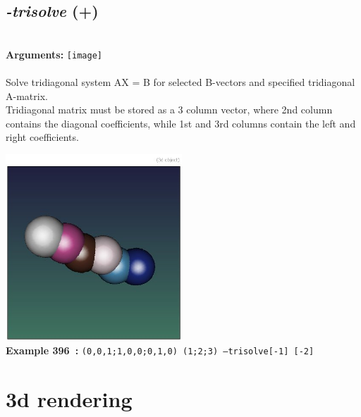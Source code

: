 \documentclass[a4paper,11pt,twoside]{book}
\begin{document}
\subsection{\emph{-trisolve} (+)}\vspace*{-0.5em}
~\\\textbf{Arguments: } 
{\small \texttt{[image]}}\\~\\
Solve tridiagonal system AX = B for selected B-vectors and specified tridiagonal A-matrix.
~\\Tridiagonal matrix must be stored as a 3 column vector, where 2nd column contains the
diagonal coefficients, while 1st and 3rd columns contain the left and right coefficients.
\begin{center}\includegraphics[keepaspectratio=true,height=7cm,width=\textwidth]{img/gmic_def396.jpg}\\
{\footnotesize \textbf{Example 396~:} \texttt{(0,0,1;1,0,0;0,1,0) (1;2;3) --trisolve[-1] [-2]}}
\end{center}
\section{3d rendering}
\end{document}
